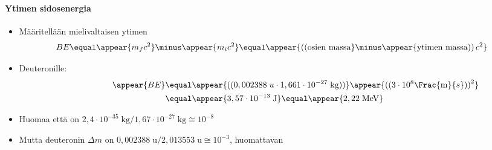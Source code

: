 \begin{frame}
\frametitle{\texorpdfstring{\culine[\sectiontitleulinecolor]{\sectiontitle}}{\sectiontitle} }
\framesubtitle{Ytimen sidosenergia}%
\appear{}

\begin{itemize}
	\item Määritellään mielivaltaisen ytimen  
\[
BE  \equal \appear{m_{f} c^{2}}  \minus \appear{m_{i} c^{2}}  \equal   \appear{\textrm{((} \text{osien massa}}  \minus \appear{\text {ytimen massa} \textrm{))}\, c^{2}}
\]

\item Deuteronille:\vspace{-7mm}
$$
\begin{aligned}
\hspace{2cm} \appear{B E} &  \equal  \appear{\textrm{((}  0,002388 \;u \cdot 1,661 \cdot 10^{-27} \mathrm{\;kg} \textrm{))} }  \appear{\textrm{((}  3 \cdot 10^{8} \Frac{\mathrm{m}}{s} \textrm{))}^{2}} \\
&  \equal \appear{3,57 \cdot 10^{-13} \mathrm{\;J}}  \equal \appear{2,22 \mathrm{\;MeV}}
\end{aligned}
$$
 

\item Huomaa että  on $2,4 \cdot 10^{-35} \mathrm{\;kg} / 1,67 \cdot 10^{-27} \mathrm{\;kg} \cong 10^{-8}$ 
\item Mutta deuteronin $\Delta m$ on $0,002388 \mathrm{\;u} / 2,013553 \mathrm{\;u} \cong 10^{-3}$, huomattavan 
\end{itemize}

\endofslide 
\end{frame}

